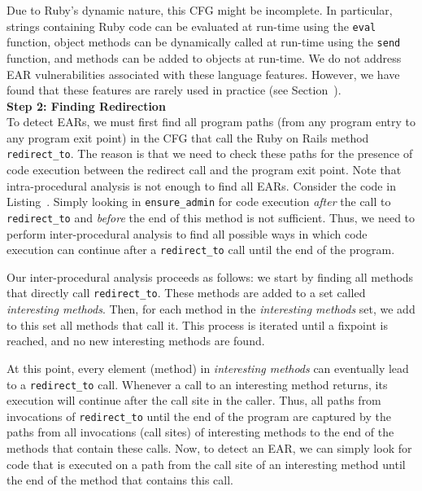 Due to Ruby's dynamic nature, this CFG might be incomplete. In particular,
strings containing Ruby code can be evaluated at run-time using the
\texttt{eval} function, object methods can be dynamically called at
run-time using the \texttt{send} function, and methods can be added to
objects at run-time. We do not address EAR vulnerabilities associated with
these language features. However, we have found that these features are
rarely used in practice (see Section~). 
\\

\noindent\textbf{Step 2: Finding Redirection}\\
To detect EARs, we must first find all program paths (from any program entry
to any program exit point) in the CFG that call the Ruby on Rails
method \texttt{redirect\_to}. The reason is that we need to check these
paths for the presence of code execution between the redirect call and
the program exit point. Note that intra-procedural analysis is not
enough to find all EARs. Consider the code in
Listing~. Simply looking in
\texttt{ensure\_admin} for code execution \emph{after} the call to
\texttt{redirect\_to} and \emph{before} the end of this method is not sufficient.
Thus, we need to perform inter-procedural analysis to find all
possible ways in which code execution can continue after a \texttt{redirect\_to}
call until the end of the program. 

Our inter-procedural analysis proceeds as follows: we start by
finding all methods that directly call \texttt{redirect\_to}. These
methods are added to a set called \emph{interesting methods}. Then,
for each method in the \emph{interesting methods} set, we add to this
set all methods that call it. This process is iterated until a
fixpoint is reached, and no new interesting methods are found.

At this point, every element (method) in \emph{interesting methods} can
eventually lead to a \texttt{redirect\_to} call. Whenever a call to an 
interesting method returns, its execution will continue after the call
site in the caller. Thus, all paths from invocations of \texttt{redirect\_to} until the
end of the program are captured by the paths from all invocations (call sites) of
interesting methods to the end of the methods that contain these
calls. Now, to detect an EAR, we can simply look for code that is
executed on a path from the call site of an interesting method until the
end of the method that contains this call.
\\



